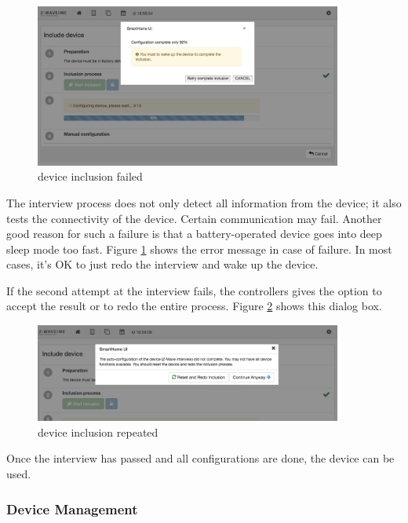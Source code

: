 \begin{figure}
\begin{center}
\includegraphics[width=0.9\textwidth]{pngs/cap4/incl4.png}
\caption{\zwave device inclusion failed}
\label{incl4}
\end{center}
\end{figure}

The interview process does not only detect all information from the device; it also tests 
the connectivity of the device. Certain communication may fail. Another good reason for 
such a failure is that a battery-operated device goes into deep sleep mode too fast. 
Figure \ref{incl4} shows the error message in case of failure. In most cases, it’s OK to 
just redo the interview and wake up the device.

If the second attempt at the interview fails, the controllers gives the option to 
accept the result or to redo the entire process. Figure \ref{incl5} shows this dialog box.

\begin{figure}
\begin{center}
\includegraphics[width=0.9\textwidth]{pngs/cap4/incl5.png}
\caption{\zwave device inclusion repeated}
\label{incl5}
\end{center}
\end{figure}

Once the interview has passed and all configurations are done, the device can be used.

\subsubsection{\zwave Device Management}

